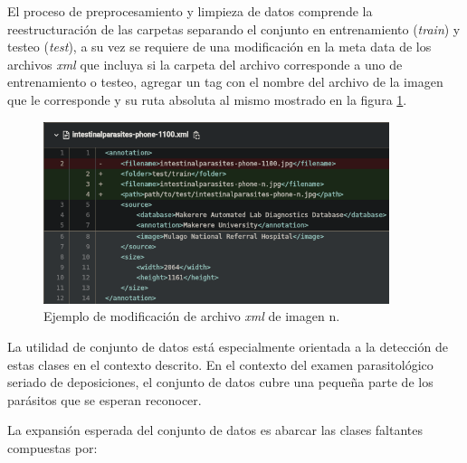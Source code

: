 \documentclass[letter,12pt]{report}
\begin{document}
El proceso de preprocesamiento y limpieza de datos comprende la reestructuración de las
carpetas separando el conjunto en entrenamiento (\textit{train}) y testeo (\textit{test}),
a su vez se requiere de una modificación en la meta data de los archivos \textit{xml}
que incluya si la carpeta del archivo corresponde a uno de entrenamiento o testeo, agregar
un tag con el nombre del archivo de la imagen que le corresponde y su ruta absoluta al mismo
mostrado en la figura \ref{fig:diff}.

\begin{figure}[ht]
    \centering
    \includegraphics[width=0.9\textwidth]{diff}
    \caption{Ejemplo de modificación de archivo \textit{xml} de imagen n.}
    \label{fig:diff}
\end{figure}

La utilidad de conjunto de datos está especialmente orientada a la detección de estas clases
en el contexto descrito. En el contexto del examen parasitológico seriado de deposiciones,
el conjunto de datos cubre una pequeña parte de los parásitos que se esperan reconocer.

La expansión esperada del conjunto de datos es abarcar las clases faltantes compuestas por:
\end{document}
